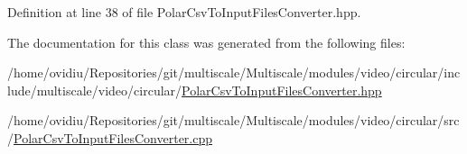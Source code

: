 Definition at line 38 of file Polar\-Csv\-To\-Input\-Files\-Converter.\-hpp.



The documentation for this class was generated from the following files\-:\begin{DoxyCompactItemize}
\item 
/home/ovidiu/\-Repositories/git/multiscale/\-Multiscale/modules/video/circular/include/multiscale/video/circular/\hyperlink{PolarCsvToInputFilesConverter_8hpp}{Polar\-Csv\-To\-Input\-Files\-Converter.\-hpp}\item 
/home/ovidiu/\-Repositories/git/multiscale/\-Multiscale/modules/video/circular/src/\hyperlink{PolarCsvToInputFilesConverter_8cpp}{Polar\-Csv\-To\-Input\-Files\-Converter.\-cpp}\end{DoxyCompactItemize}
